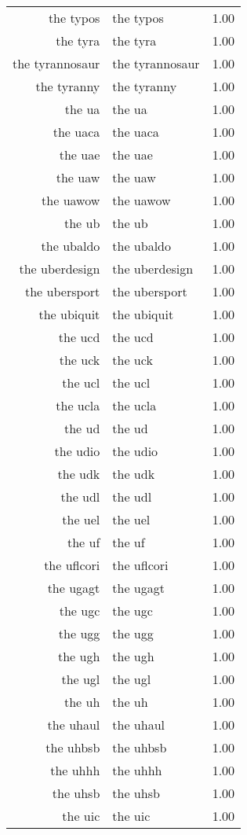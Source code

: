 \begin{table}[ht]
\begin{tabular}{rlr}
  the typos & the typos & 1.00 \\ 
  the tyra & the tyra & 1.00 \\ 
  the tyrannosaur & the tyrannosaur & 1.00 \\ 
  the tyranny & the tyranny & 1.00 \\ 
  the ua & the ua & 1.00 \\ 
  the uaca & the uaca & 1.00 \\ 
  the uae & the uae & 1.00 \\ 
  the uaw & the uaw & 1.00 \\ 
  the uawow & the uawow & 1.00 \\ 
  the ub & the ub & 1.00 \\ 
  the ubaldo & the ubaldo & 1.00 \\ 
  the uberdesign & the uberdesign & 1.00 \\ 
  the ubersport & the ubersport & 1.00 \\ 
  the ubiquit & the ubiquit & 1.00 \\ 
  the ucd & the ucd & 1.00 \\ 
  the uck & the uck & 1.00 \\ 
  the ucl & the ucl & 1.00 \\ 
  the ucla & the ucla & 1.00 \\ 
  the ud & the ud & 1.00 \\ 
  the udio & the udio & 1.00 \\ 
  the udk & the udk & 1.00 \\ 
  the udl & the udl & 1.00 \\ 
  the uel & the uel & 1.00 \\ 
  the uf & the uf & 1.00 \\ 
  the uflcori & the uflcori & 1.00 \\ 
  the ugagt & the ugagt & 1.00 \\ 
  the ugc & the ugc & 1.00 \\ 
  the ugg & the ugg & 1.00 \\ 
  the ugh & the ugh & 1.00 \\ 
  the ugl & the ugl & 1.00 \\ 
  the uh & the uh & 1.00 \\ 
  the uhaul & the uhaul & 1.00 \\ 
  the uhbsb & the uhbsb & 1.00 \\ 
  the uhhh & the uhhh & 1.00 \\ 
  the uhsb & the uhsb & 1.00 \\ 
  the uic & the uic & 1.00 \\ 

\end{tabular}
\end{table}
